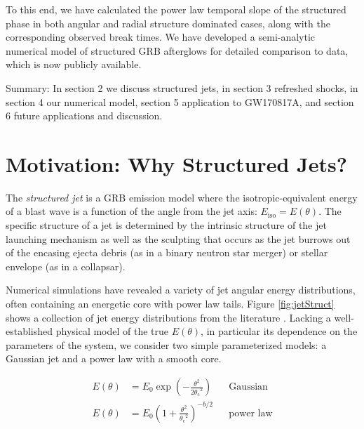 \documentclass[twocolumn]{aastex62}
\newcommand{\gwbns}{GW170817A}
\newcommand{\thC}{\ensuremath{\theta_{\mathrm{c}}}}
\newcommand{\Eiso}{\ensuremath{E_{\mathrm{iso}}}}
\begin{document}
To this end, we have calculated the power law temporal slope of the structured phase in both angular and radial structure dominated cases, along with the corresponding observed break times.  We have developed a semi-analytic numerical model of structured GRB afterglows for detailed comparison to data, which is now publicly available.

Summary: In section 2 we discuss structured jets, in section 3 refreshed shocks, in section 4 our numerical model, section 5 application to \gwbns{}, and section 6 future applications and discussion.

\section{Motivation: Why Structured Jets?}\label{sec:motivation}

The \emph{structured jet} is a GRB emission model where the isotropic-equivalent energy of a blast wave is a function of the angle from the jet axis: $\Eiso = E(\theta)$. The specific structure of a jet is determined by the intrinsic structure of the jet launching mechanism as well as the sculpting that occurs as the jet burrows out of the encasing ejecta debris (as in a binary neutron star merger) or stellar envelope (as in a collapsar).  

Numerical simulations have revealed a variety of jet angular energy distributions, often containing an energetic core with power law tails.  Figure \ref{fig:jetStruct} shows a collection of jet energy distributions from the literature \citep{Aloy:2005aa, Mizuta:2009aa, Duffell:2013aa, Lazzati:2017aa, Margutti:2018aa}.  Lacking a well-established physical model of the true $E(\theta)$, in particular its dependence on the parameters of the system, we consider two simple parameterized models: a Gaussian jet and a power law with a smooth core.  

\begin{align}
	E(\theta) &= E_0 \exp\left(-\frac{\theta^2}{2\thC^2}\right)  && \text{Gaussian} \label{eq:gauss}\\
	E(\theta) &= E_0 \left(1 + \frac{\theta^2}{\thC^2} \right)^{-b/2}  && \text{power law} \label{eq:pl}
\end{align}

%
%
\end{document}
